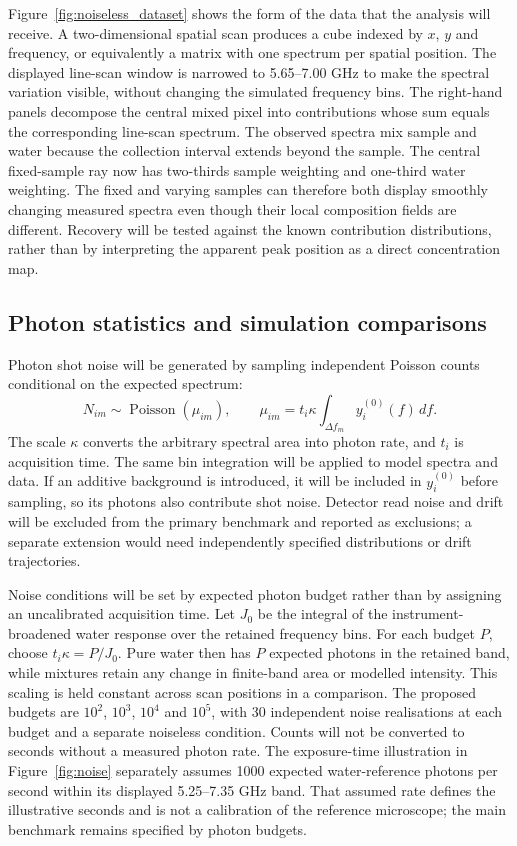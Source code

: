 \documentclass[11pt]{article}
\begin{document}
Figure~\ref{fig:noiseless_dataset} shows the form of the data that the analysis will receive. A two-dimensional spatial scan produces a cube indexed by $x$, $y$ and frequency, or equivalently a matrix with one spectrum per spatial position. The displayed line-scan window is narrowed to 5.65--7.00 GHz to make the spectral variation visible, without changing the simulated frequency bins. The right-hand panels decompose the central mixed pixel into contributions whose sum equals the corresponding line-scan spectrum. The observed spectra mix sample and water because the collection interval extends beyond the sample. The central fixed-sample ray now has two-thirds sample weighting and one-third water weighting. The fixed and varying samples can therefore both display smoothly changing measured spectra even though their local composition fields are different. Recovery will be tested against the known contribution distributions, rather than by interpreting the apparent peak position as a direct concentration map.

\subsection{Photon statistics and simulation comparisons}

Photon shot noise will be generated by sampling independent Poisson counts conditional on the expected spectrum:
\begin{equation}
 N_{im}\sim\operatorname{Poisson}(\mu_{im}),\qquad
 \mu_{im}=t_i\kappa\int_{\Delta f_m}y_i^{(0)}(f)\,df.
 \label{eq:noise_model}
\end{equation}
The scale $\kappa$ converts the arbitrary spectral area into photon rate, and $t_i$ is acquisition time. The same bin integration will be applied to model spectra and data. If an additive background is introduced, it will be included in $y_i^{(0)}$ before sampling, so its photons also contribute shot noise. Detector read noise and drift will be excluded from the primary benchmark and reported as exclusions; a separate extension would need independently specified distributions or drift trajectories.

Noise conditions will be set by expected photon budget rather than by assigning an uncalibrated acquisition time. Let $J_0$ be the integral of the instrument-broadened water response over the retained frequency bins. For each budget $P$, choose $t_i\kappa=P/J_0$. Pure water then has $P$ expected photons in the retained band, while mixtures retain any change in finite-band area or modelled intensity. This scaling is held constant across scan positions in a comparison. The proposed budgets are $10^2$, $10^3$, $10^4$ and $10^5$, with 30 independent noise realisations at each budget and a separate noiseless condition. Counts will not be converted to seconds without a measured photon rate. The exposure-time illustration in Figure~\ref{fig:noise} separately assumes 1000 expected water-reference photons per second within its displayed 5.25--7.35 GHz band. That assumed rate defines the illustrative seconds and is not a calibration of the reference microscope; the main benchmark remains specified by photon budgets.
\end{document}
